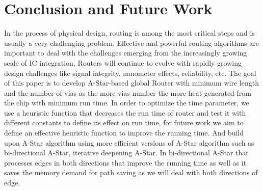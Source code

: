 \documentclass[conference]{IEEEtran}
\begin{document}
\section{Conclusion and Future Work}

In the process of physical design, routing is among the most critical steps and is usually a very challenging problem. Effective and powerful routing algorithms are important to deal with the challenges emerging from the increasingly growing scale of IC integration, Routers will continue to evolve with rapidly growing design challenges like signal integrity, nanometer effects, reliability, etc. The goal of this paper is to develop A-Star-based global Router with minimum wire length and the number of vias as the more vias number the more heat generated from the chip with minimum run time. In order to optimize the time parameter, we use a heuristic function that decreases the run time of router and test it with different constants to define its effect on run time, for future work we aim to define an effective heuristic function to improve the running time. And build upon A-Star algorithm using more efficient versions of A-Star algorithm such as bi-directional A-Star, iterative deepening A-Star. In bi-directional A-Star that processes edges in both directions that improve the running time as well as it saves the memory demand for path saving as we will deal with both directions of edge.

\end{document}
